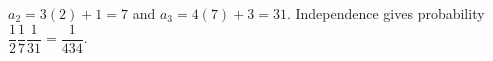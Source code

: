 $a_2=3(2)+1=7$ and $a_3=4(7)+3=31$. Independence gives probability $\dfrac{1}{2}\dfrac{1}{7}\dfrac{1}{31}=\boxed{\dfrac{1}{434}}$.
